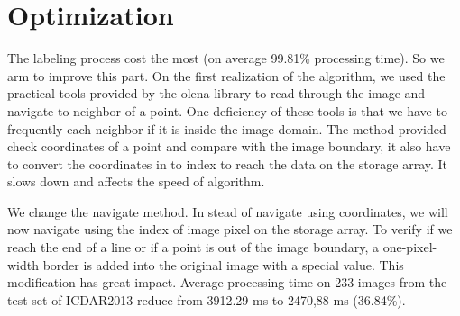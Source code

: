 \section{Optimization}

The labeling process cost the most (on average 99.81\% processing time). So we arm to improve this part. On the first realization of the algorithm, we used the practical tools provided by the olena library to read through the image and navigate to neighbor of a point. One deficiency of these tools is that we have to frequently each neighbor if it is inside the image domain. The method provided check coordinates of a point and compare with the image boundary, it also have to convert the coordinates in to index to reach the data on the storage array. It slows down and affects the speed of algorithm. 


We change the navigate method. In stead of navigate using coordinates, we will now navigate using the index of image pixel on the storage array. To verify if we reach the end of a line or if a point is out of the image boundary, a one-pixel-width border is added into the original image with a special value. This modification has great impact. Average processing time on 233 images from the test set of ICDAR2013 reduce from 3912.29 ms to 2470,88 ms (36.84\%).




